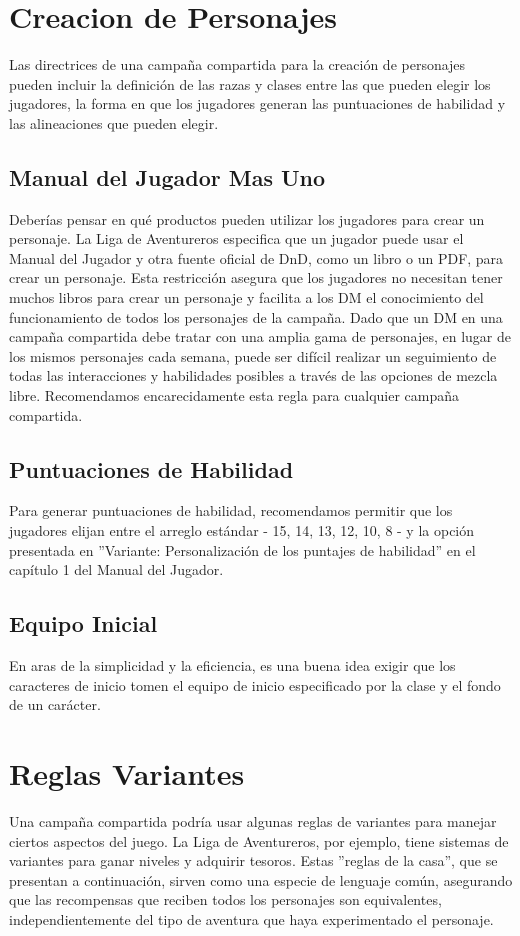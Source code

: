 \documentclass[a4paper,twocolumn,openany,10pt]{dndbook}
\begin{document}
\section*{Creacion de Personajes}
Las directrices de una campaña compartida para la creación de personajes pueden incluir la definición de las razas y clases
entre las que pueden elegir los jugadores, la forma en que los jugadores generan las puntuaciones de habilidad y las
alineaciones que pueden elegir. 

\subsection*{Manual del Jugador Mas Uno}
Deberías pensar en qué productos pueden utilizar los jugadores para crear un personaje. La Liga de Aventureros especifica que un
jugador puede usar el Manual del Jugador y otra fuente oficial de DnD, como un libro o un PDF, para crear un personaje. Esta
restricción asegura que los jugadores no necesitan tener muchos libros para crear un personaje y facilita a los DM el
conocimiento del funcionamiento de todos los personajes de la campaña. Dado que un DM en una campaña compartida debe tratar con
una amplia gama de personajes, en lugar de los mismos personajes cada semana, puede ser difícil realizar un seguimiento de todas
las interacciones y habilidades posibles a través de las opciones de mezcla libre. Recomendamos encarecidamente esta regla para
cualquier campaña compartida. 

\subsection*{Puntuaciones de Habilidad}
Para generar puntuaciones de habilidad, recomendamos permitir que los jugadores elijan entre el arreglo estándar - 15, 14, 13,
12, 10, 8 - y la opción presentada en ''Variante: Personalización de los puntajes de habilidad'' en el capítulo 1 del Manual del
Jugador. 

\subsection*{Equipo Inicial}
En aras de la simplicidad y la eficiencia, es una buena idea exigir que los caracteres de inicio tomen el equipo de inicio
especificado por la clase y el fondo de un carácter. 

\section*{Reglas Variantes}
Una campaña compartida podría usar algunas reglas de variantes para manejar ciertos aspectos del juego. La Liga de Aventureros,
por ejemplo, tiene sistemas de variantes para ganar niveles y adquirir tesoros. Estas ''reglas de la casa'', que se presentan a
continuación, sirven como una especie de lenguaje común, asegurando que las recompensas que reciben todos los personajes son
equivalentes, independientemente del tipo de aventura que haya experimentado el personaje. 
\end{document}
